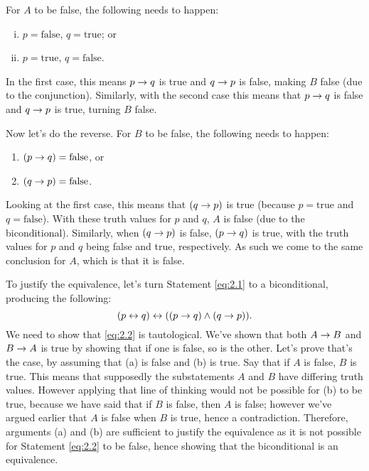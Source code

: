 \documentclass[12pt,a4paper]{article}
\begin{document}
    \begin{answer}
        For \(A\) to be false, the following needs to happen:
        \begin{enumerate}[i.]
        	\item \(p = \text{false}\), \(q = \text{true}\); or
        	\item \(p = \text{true}\), \(q = \text{false}\).
        \end{enumerate}
        In the first case, this means \(p \rightarrow q\) is true and \(q \rightarrow p\) is false, making \(B\) false (due to the conjunction). 
        Similarly, with the second case this means that \(p \rightarrow q\) is false and \(q \rightarrow p\) is true, turning \(B\) false.

        Now let's do the reverse. For \(B\) to be false, the following needs to happen:
        \begin{enumerate}
        	\item \((p \rightarrow q) = \text{false}\), or
        	\item \((q \rightarrow p) = \text{false}\).
        \end{enumerate}
        Looking at the first case, this means that \((q \rightarrow p)\) is true (because \(p = \text{true}\) and \(q = \text{false}\)).
        With these truth values for \(p\) and \(q\), \(A\) is false (due to the biconditional).
        Similarly, when \((q \rightarrow p)\) is false, \((p \rightarrow q)\) is true, with the truth values for \(p\) and \(q\) being false and true, respectively.
        As such we come to the same conclusion for \(A\), which is that it is false.

        To justify the equivalence, let's turn Statement \ref{eq:2.1} to a biconditional, producing the following:
        \begin{equation} \label{eq:2.2}
        	(p \leftrightarrow q) \leftrightarrow ((p\rightarrow q) \wedge (q \rightarrow p)).
        \end{equation}
        We need to show that \eqref{eq:2.2} is tautological. 
        We've shown that both \(A \rightarrow B\) and \(B \rightarrow A\) is true by showing that if one is false, so is the other. 
        Let's prove that's the case, by assuming that (a) is false and (b) is true.
        Say that if \(A\) is false, \(B\) is true. This means that supposedly the substatements \(A\) and \(B\) have differing truth values.
        However applying that line of thinking would not be possible for (b) to be true, because we have said that if \(B\) is false, then \(A\) is false; however we've argued earlier that \(A\) is false when \(B\) is true, hence a contradiction. 
        Therefore, arguments (a) and (b) are sufficient to justify the equivalence as it is not possible for Statement \ref{eq:2.2} to be false, hence showing that the biconditional is an equivalence.
    \end{answer}
\end{document}
